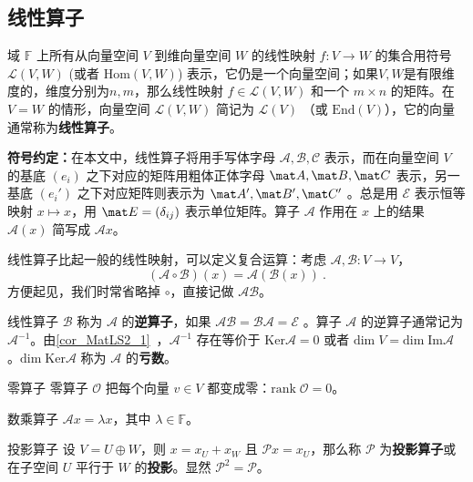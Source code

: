 
\begin{issues}
\issueTODO
\end{issues}


\subsection{线性算子}\label{sub_LiOper_4}

域 $\mathbb{F}$ 上所有从向量空间 $V$ 到维向量空间 $W$ 的线性映射 $f:V\rightarrow W$ 的集合用符号 $\mathcal{L}(V, W)$ (或者 $\mathrm{Hom}(V, W)$) 表示，它仍是一个向量空间；如果$V, W$是有限维度的，维度分别为$n, m$，那么线性映射 $f \in \mathcal{L}(V, W)$ 和一个 $m\times n$ 的矩阵。在 $V=W$ 的情形，向量空间 $\mathcal{L}(V, W)$ 简记为 $\mathcal{L}(V)$ （或 $\mathrm{End}(V)$），它的向量通常称为\textbf{线性算子}。

\textbf{符号约定：}在本文中，线性算子将用手写体字母 $\mathcal{A,B,C}$ 表示，而在向量空间 $V$ 的基底 $(e_i)$ 之下对应的矩阵用粗体正体字母 $\mat A,\mat B,\mat C$ 表示，另一基底 $(e_i')$ 之下对应矩阵则表示为 $\mat A',\mat B',\mat C'$ 。总是用 $\mathcal{E}$ 表示恒等映射 $x \mapsto  x$，用 $\mat E = (\delta_{ij})$ 表示单位矩阵。算子 $\mathcal{A}$ 作用在 $ x$ 上的结果 $\mathcal{A}(x)$ 简写成 $\mathcal{A} x$。

线性算子比起一般的线性映射，可以定义复合运算：考虑 $\mathcal{A}, \mathcal{B}: V \to V$，
\begin{equation}
(\mathcal{A} \circ \mathcal{B})(x) = \mathcal{A} (\mathcal{B}(x))~.
\end{equation}
方便起见，我们时常省略掉 $\circ$，直接记做 $\mathcal{A} \mathcal{B}$。

线性算子 $\mathcal{B}$ 称为 $\mathcal{A}$ 的\textbf{逆算子}，如果 $\mathcal{AB}=\mathcal{BA}=\mathcal{E}$ 。算子 $\mathcal{A}$ 的逆算子通常记为 $\mathcal{A}^{-1}$。由\autoref{cor_MatLS2_1}~，$\mathcal{A}^{-1}$ 存在等价于 $\mathrm{Ker}\mathcal{A}=0$ 或者 $\mathrm{dim}\;V=\mathrm{dim\;Im}\mathcal{A}$ 。$\mathrm{dim\;Ker}\mathcal{A}$ 称为 $\mathcal{A}$ 的\textbf{亏数}。
\begin{example}{零算子}\label{ex_LiOper_1}
零算子 $\mathcal{O}$ 把每个向量 $ v\in V$ 都变成零：$\mathrm{rank}\; \mathcal{O}=0$。
\end{example}
\begin{example}{数乘算子}
$\mathcal{A} x=\lambda x$，其中 $\lambda\in\mathbb{F}$。
\end{example}
\begin{example}{投影算子}
设 $V=U\oplus W$，则 $ x= x_U+ x_W$ 且 $\mathcal{P} x= x_U$，那么称 $\mathcal{P}$ 为\textbf{投影算子}或在子空间 $U$ 平行于 $W$ 的\textbf{投影}。显然 $\mathcal{P}^2=\mathcal{P}$。
\end{example}


